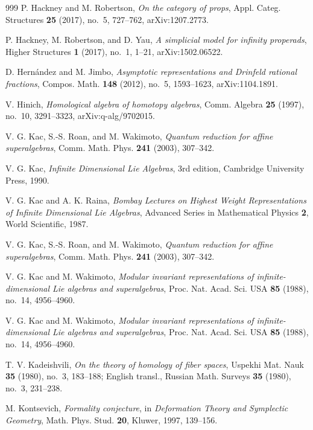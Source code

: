\begin{thebibliography}{999}
P. Hackney and M. Robertson, \emph{On the category of props}, Appl. Categ. Structures \textbf{25} (2017), no.~5, 727--762, arXiv:1207.2773.

P. Hackney, M. Robertson, and D. Yau,
\emph{A simplicial model for infinity properads},
Higher Structures \textbf{1} (2017), no.~1, 1--21,
arXiv:1502.06522.

D. Hern\'andez and M. Jimbo, \emph{Asymptotic representations and Drinfeld rational fractions}, Compos. Math. \textbf{148} (2012), no.~5, 1593--1623, arXiv:1104.1891.

V. Hinich, \emph{Homological algebra of homotopy algebras}, Comm. Algebra \textbf{25} (1997), no.~10, 3291--3323, arXiv:q-alg/9702015.

V. G. Kac, S.-S. Roan, and M. Wakimoto, \emph{Quantum reduction for affine superalgebras}, Comm. Math. Phys. \textbf{241} (2003), 307--342.

V. G. Kac, \emph{Infinite Dimensional Lie Algebras}, 3rd edition, Cambridge University Press, 1990.

V. G. Kac and A. K. Raina, \emph{Bombay Lectures on Highest Weight Representations of Infinite Dimensional Lie Algebras}, Advanced Series in Mathematical Physics \textbf{2}, World Scientific, 1987.

V. G. Kac, S.-S. Roan, and M. Wakimoto, \emph{Quantum reduction for affine superalgebras}, Comm. Math. Phys. \textbf{241} (2003), 307--342.

V. G. Kac and M. Wakimoto, \emph{Modular invariant representations of infinite-dimensional Lie algebras and superalgebras}, Proc. Nat. Acad. Sci. USA \textbf{85} (1988), no.~14, 4956--4960.

V. G. Kac and M. Wakimoto, \emph{Modular invariant representations of infinite-dimensional Lie algebras and superalgebras}, Proc. Nat. Acad. Sci. USA \textbf{85} (1988), no.~14, 4956--4960.

T. V. Kadeishvili, \emph{On the theory of homology of fiber spaces}, Uspekhi Mat. Nauk \textbf{35} (1980), no.~3, 183--188; English transl., Russian Math. Surveys \textbf{35} (1980), no.~3, 231--238.

M. Kontsevich, \emph{Formality conjecture}, in \emph{Deformation Theory and Symplectic Geometry}, Math. Phys. Stud. \textbf{20}, Kluwer, 1997, 139--156.


\end{thebibliography}
